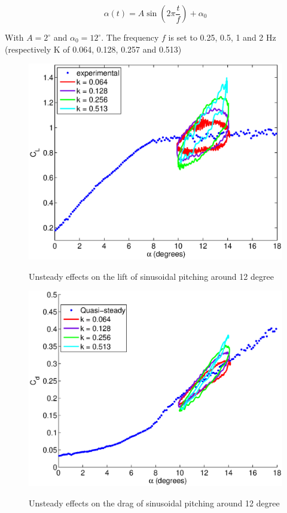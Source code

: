 \begin{equation}
	\alpha\left( t \right)= A \sin \left( 2 \pi \frac{t}{f} \right) + \alpha_0
	\label{eqn:pitch_input}
\end{equation}

With $A=2^\circ$ and $\alpha_0=12^\circ$.
The frequency $f$ is set to 0.25, 0.5, 1 and 2 Hz (respectively K of 0.064, 0.128, 0.257 and 0.513)

\begin{figure}[h]
  \begin{center}
    \scalebox{0.8}  
    {\includegraphics{./Figures/Pitching_allcases_CL_12_amp_2.eps}}
  \end{center}
  \caption{Unsteady effects on the lift of sinusoidal pitching around 12 degree} 
  \label{fig:Pitching_allcases_Cl_12}
\end{figure}

\begin{figure}[h]
  \begin{center}
    \scalebox{0.8}  
    {\includegraphics{./Figures/Pitching_allcases_CD_12_amp_2.eps}}
  \end{center}
  \caption{Unsteady effects on the drag of sinusoidal pitching around 12 degree} 
  \label{fig:Pitching_allcases_Cd_12}
\end{figure}

